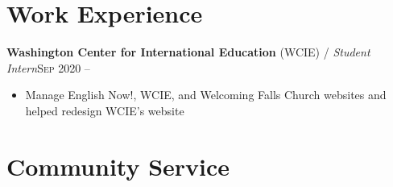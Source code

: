 \documentclass[12pt, a4paper]{article}
\begin{document}

\vspace{-8mm}
\section*{Work Experience}
\vspace{-2mm}


\textbf{Washington Center for International Education} (WCIE) / \textit{Student Intern}\hfill\textsc{Sep 2020 --}\\
\begin{itemize}
    \vspace{-8mm}
    \item Manage English Now!, WCIE, and Welcoming Falls Church websites and helped redesign WCIE's website
\end{itemize}



\vspace{-8mm}
\section*{Community Service}
\vspace{-2mm}
\end{document}
